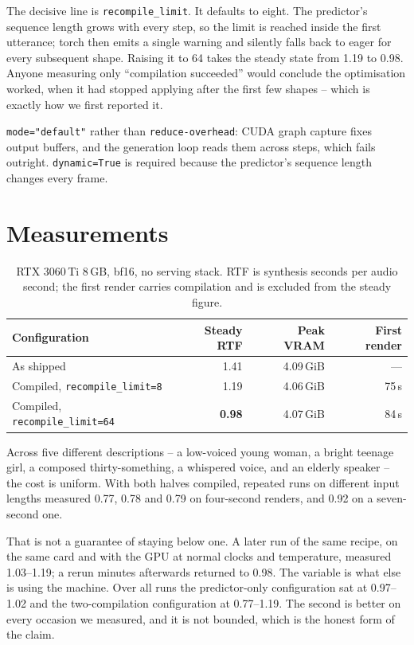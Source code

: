 \documentclass[11pt]{article}
\begin{document}
The decisive line is \texttt{recompile\_limit}. It defaults to eight. The predictor's sequence length grows with
every step, so the limit is reached inside the first utterance; torch then emits a single warning and silently falls
back to eager for every subsequent shape. Raising it to 64 takes the steady state from 1.19 to 0.98. Anyone
measuring only ``compilation succeeded'' would conclude the optimisation worked, when it had stopped applying after
the first few shapes -- which is exactly how we first reported it.

\texttt{mode="default"} rather than \texttt{reduce-overhead}: CUDA graph capture fixes output buffers, and the
generation loop reads them across steps, which fails outright. \texttt{dynamic=True} is required because the
predictor's sequence length changes every frame.

\section{Measurements}

\begin{table}[h]
\centering
\small
\begin{tabular}{lrrr}
\toprule
Configuration & Steady RTF & Peak VRAM & First render \\
\midrule
As shipped & 1.41 & 4.09\,GiB & --- \\
Compiled, \texttt{recompile\_limit=8} & 1.19 & 4.06\,GiB & 75\,s \\
Compiled, \texttt{recompile\_limit=64} & \textbf{0.98} & 4.07\,GiB & 84\,s \\
\bottomrule
\end{tabular}
\caption{RTX 3060\,Ti 8\,GB, bf16, no serving stack. RTF is synthesis seconds per audio second; the first render
carries compilation and is excluded from the steady figure.}
\end{table}

Across five different descriptions -- a low-voiced young woman, a bright teenage girl, a composed thirty-something,
a whispered voice, and an elderly speaker -- the cost is uniform. With both halves compiled, repeated runs on
different input lengths measured 0.77, 0.78 and 0.79 on four-second renders, and 0.92 on a seven-second one.

That is not a guarantee of staying below one. A later run of the same recipe, on the same card and with the GPU at
normal clocks and temperature, measured 1.03--1.19; a rerun minutes afterwards returned to 0.98. The variable is
what else is using the machine. Over all runs the predictor-only configuration sat at 0.97--1.02 and the
two-compilation configuration at 0.77--1.19. The second is better on every occasion we measured, and it is not
bounded, which is the honest form of the claim.
\end{document}
